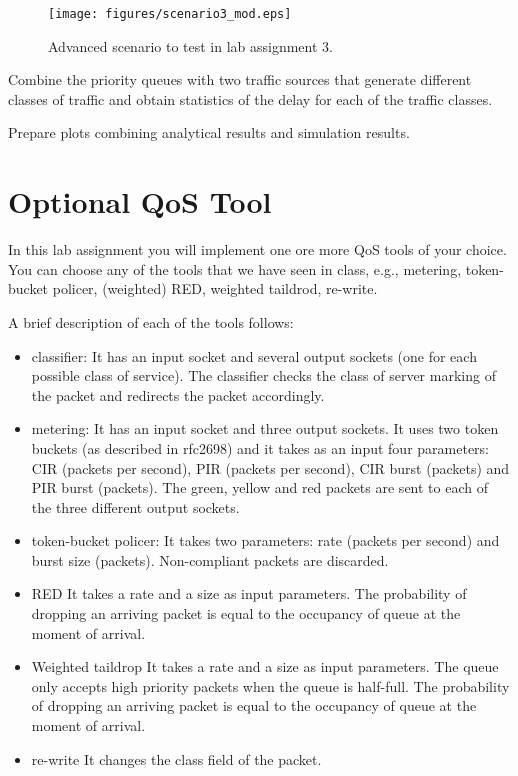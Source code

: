 \begin{figure}[!h]
\centering
\texttt{[image: figures/scenario3\_mod.eps]}
\caption{Advanced scenario to test in lab assignment 3.}
\label{fig:scenario3_mod}
\end{figure}

Combine the priority queues with two traffic sources that generate different classes of traffic and obtain statistics of the delay for each of the traffic classes.

Prepare plots combining analytical results and simulation results.

\section{Optional QoS Tool}

In this lab assignment you will implement one ore more QoS tools of your choice.
You can choose any of the tools that we have seen in class, e.g.,  metering, token-bucket policer, (weighted) RED, weighted taildrod, re-write.

A brief description of each of the tools follows:
\begin{itemize}
  \item{classifier:}
  It has an input socket and several output sockets (one for each possible class of service).
  The classifier checks the class of server marking of the packet and redirects the packet accordingly.
  \item{metering:}
  It has an input socket and three output sockets.
  It uses two token buckets (as described in rfc2698) and it takes as an input four parameters: CIR (packets per second), PIR (packets per second), CIR burst (packets) and PIR burst (packets).
  The green, yellow and red packets are sent to each of the three different output sockets.
  \item{token-bucket policer:}
  It takes two parameters: rate (packets per second) and burst size (packets).
  Non-compliant packets are discarded.
  \item{ RED}
  It takes a rate and a size as input parameters.
   The probability of dropping an arriving packet is equal to the occupancy of queue at the moment of arrival.
  \item{Weighted taildrop }
  It takes a rate and a size as input parameters.
  The queue only accepts high priority packets when the queue is half-full.
   The probability of dropping an arriving packet is equal to the occupancy of queue at the moment of arrival.
  \item{re-write}
  It changes the class field of the packet.
\end{itemize}

